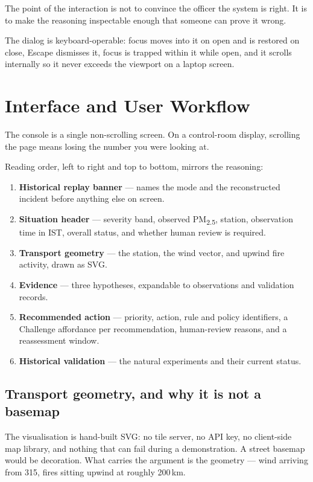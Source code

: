 \documentclass[11pt,a4paper]{article}
\newcommand{\PM}{PM\textsubscript{2.5}}
\begin{document}
The point of the interaction is not to convince the officer the system is right. It
is to make the reasoning inspectable enough that someone can prove it wrong.

The dialog is keyboard-operable: focus moves into it on open and is restored on
close, Escape dismisses it, focus is trapped within it while open, and it scrolls
internally so it never exceeds the viewport on a laptop screen.

\section{Interface and User Workflow}

The console is a single non-scrolling screen. On a control-room display, scrolling
the page means losing the number you were looking at.

Reading order, left to right and top to bottom, mirrors the reasoning:

\begin{enumerate}
  \item \textbf{Historical replay banner} --- names the mode and the reconstructed
  incident before anything else on screen.
  \item \textbf{Situation header} --- severity band, observed \PM{}, station,
  observation time in IST, overall status, and whether human review is required.
  \item \textbf{Transport geometry} --- the station, the wind vector, and upwind
  fire activity, drawn as SVG.
  \item \textbf{Evidence} --- three hypotheses, expandable to observations and
  validation records.
  \item \textbf{Recommended action} --- priority, action, rule and policy
  identifiers, a Challenge affordance per recommendation, human-review reasons, and
  a reassessment window.
  \item \textbf{Historical validation} --- the natural experiments and their current
  status.
\end{enumerate}

\subsection{Transport geometry, and why it is not a basemap}

The visualisation is hand-built SVG: no tile server, no API key, no client-side map
library, and nothing that can fail during a demonstration. A street basemap would be
decoration. What carries the argument is the geometry --- wind arriving from
315\textdegree{}, fires sitting upwind at roughly 200\,km.
\end{document}
